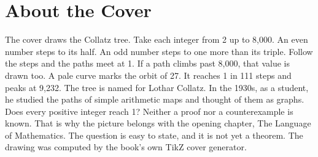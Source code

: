 \backmatter
\cleardoublepage
\chapter*{About the Cover}
\noindent The cover draws the Collatz tree. Take each integer from 2 up to 8,000. An even number steps to its half. An odd number steps to one more than its triple. Follow the steps and the paths meet at 1. If a path climbs past 8,000, that value is drawn too. A pale curve marks the orbit of 27. It reaches 1 in 111 steps and peaks at 9,232. The tree is named for Lothar Collatz. In the 1930s, as a student, he studied the paths of simple arithmetic maps and thought of them as graphs. Does every positive integer reach 1? Neither a proof nor a counterexample is known. That is why the picture belongs with the opening chapter, The Language of Mathematics. The question is easy to state, and it is not yet a theorem. The drawing was computed by the book's own TikZ cover generator.
